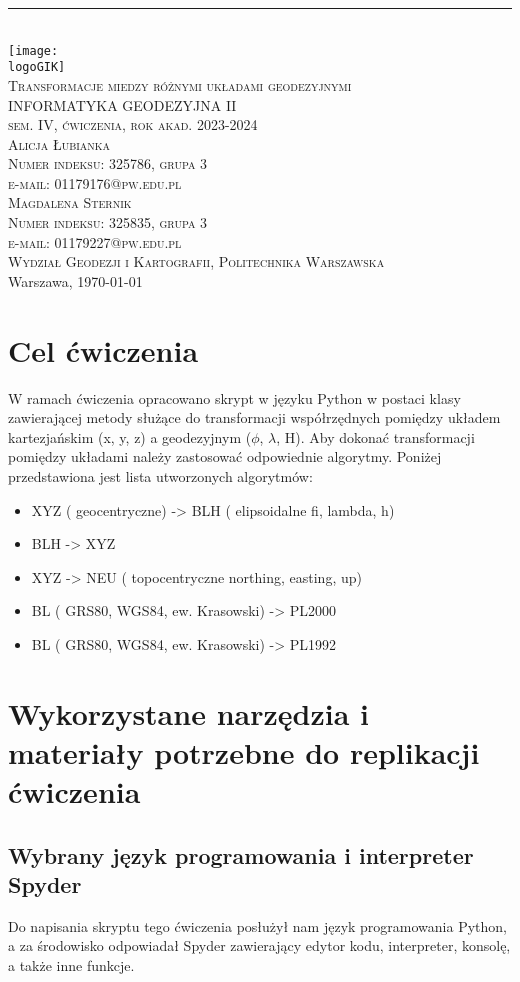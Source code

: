 \documentclass[10pt,a4paper]{article}
\makeatletter
\newcommand{\logoGIK}{WGiK-znak.png}
\newcommand{\authorName}{Alicja Łubianka \\ Numer indeksu: 325786, grupa 3 \\ e-mail: 01179176@pw.edu.pl\\ Magdalena Sternik \\ Numer indeksu: 325835, grupa 3 \\ e-mail: 01179227@pw.edu.pl}
\newcommand{\titeReport}{Transformacje miedzy różnymi układami geodezyjnymi} %
\newcommand{\titleLecture}{INFORMATYKA GEODEZYJNA II\\ sem. IV, ćwiczenia, rok akad. 2023-2024} %
\newcommand{\faculty}{Wydział Geodezji i Kartografii}
\newcommand{\university}{Politechnika Warszawska}
\newcommand{\city}{Warszawa}
\makeatother
\begin{document}
	\begin{center} 
		\rule{\textwidth}{.5pt} \\
		\vspace{1.0cm}
		\texttt{[image: \\logoGIK]}
		\vspace{0.5cm} \\
		\Large \textsc{\titeReport}
		\vspace{0.5cm} \\  
		\large \textsc{\titleLecture}
		\vspace{0.5cm}\\
		\textsc{\authorName}  \\
		\textsc{\faculty}, \textsc{\university}  \\ 
		\city, \today
	\end{center}
	\newpage
	\tableofcontents
	\newpage
	\section{Cel ćwiczenia}
	W ramach ćwiczenia opracowano skrypt w języku Python w postaci klasy zawierającej metody służące do transformacji współrzędnych pomiędzy układem kartezjańskim (x, y, z) a geodezyjnym ($\phi$, $\lambda$, H). Aby dokonać transformacji pomiędzy układami należy zastosować odpowiednie algorytmy. Poniżej przedstawiona jest lista utworzonych algorytmów:
	\begin{itemize}
		\item XYZ ( geocentryczne) -> BLH ( elipsoidalne fi, lambda, h)
		\item BLH -> XYZ 
		\item XYZ -> NEU ( topocentryczne northing, easting, up)
		\item BL ( GRS80, WGS84, ew. Krasowski) -> PL2000
		\item BL ( GRS80, WGS84, ew. Krasowski) -> PL1992
		
	\end{itemize}
	\section{Wykorzystane narzędzia i materiały potrzebne do replikacji ćwiczenia}
	
	\subsection{Wybrany język programowania i interpreter Spyder}
	

		
	Do napisania skryptu tego ćwiczenia posłużył nam język programowania Python, a za środowisko odpowiadał Spyder zawierający edytor kodu, interpreter, konsolę, a także inne funkcje.
	 
\end{document}
